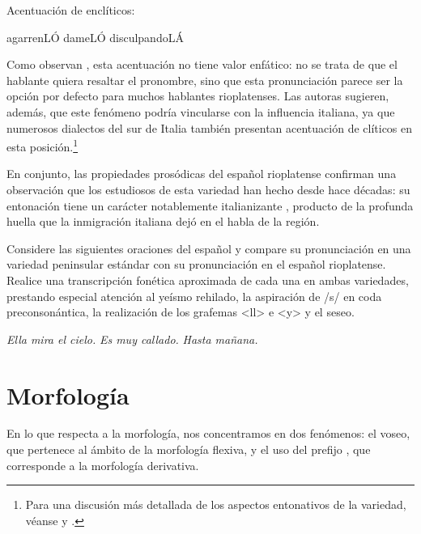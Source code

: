 \begin{exe}
  \ex\label{ex:15-encliticos} Acentuación de enclíticos:
    \begin{xlist}
      \ex agarrenLÓ
      \ex dameLÓ
      \ex disculpandoLÁ
    \end{xlist}
\end{exe}

Como observan \textcite{colantoni2013cuervo}, esta acentuación no tiene valor
enfático: no se trata de que el hablante quiera resaltar el pronombre, sino que
esta pronunciación parece ser la opción por defecto para muchos hablantes
rioplatenses. Las autoras sugieren, además, que este fenómeno podría vincularse
con la influencia italiana, ya que numerosos dialectos del sur de Italia también
presentan acentuación de clíticos en esta posición.\footnote{Para una discusión
más detallada de los aspectos entonativos de la variedad, véanse
\textcite{gabriel2010,gabriel2011} y \textcite{colantoni2014}.}

\begin{destacado}
En conjunto, las propiedades prosódicas del español rioplatense confirman una
observación que los estudiosos de esta variedad han hecho desde hace décadas: su
entonación tiene un carácter notablemente italianizante \parencite{vidal1964},
producto de la profunda huella que la inmigración italiana dejó en el habla de la
región.
\end{destacado}

\begin{ejercicio}\label{ej:15-transcripcion}
Considere las siguientes oraciones del español y compare su pronunciación en una
variedad peninsular estándar con su pronunciación en el español rioplatense.
Realice una transcripción fonética aproximada de cada una en ambas variedades,
prestando especial atención al yeísmo rehilado, la aspiración de /s/ en coda
preconsonántica, la realización de los grafemas <ll> e <y> y el seseo.

\begin{exe}
  \ex \textit{Ella mira el cielo.}
  \ex \textit{Es muy callado.}
  \ex \textit{Hasta mañana.}
\end{exe}
\end{ejercicio}

\section{Morfología}\label{sec:15-morfologia}

En lo que respecta a la morfología, nos concentramos en dos fenómenos: el voseo,
que pertenece al ámbito de la morfología flexiva, y el uso del prefijo
, que corresponde a la morfología derivativa.


